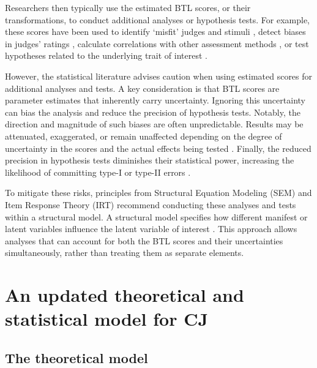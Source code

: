 \documentclass[
  authoryear,
  preprint,
  1p]{elsarticle}
\begin{document}
Researchers then typically use the estimated BTL scores, or their
transformations, to conduct additional analyses or hypothesis tests. For
example, these scores have been used to identify `misfit' judges and
stimuli \citep{Pollitt_2012b, vanDaal_et_al_2016, Goossens_et_al_2018},
detect biases in judges' ratings
\citep{Pollitt_et_al_2003, Pollitt_2012b}, calculate correlations with
other assessment methods \citep{Goossens_et_al_2018, Bouwer_et_al_2023},
or test hypotheses related to the underlying trait of interest
\citep{Bramley_et_al_2019, Boonen_et_al_2020, Bouwer_et_al_2023, vanDaal_et_al_2017, Jones_et_al_2019, Gijsen_et_al_2021}.

However, the statistical literature advises caution when using estimated
scores for additional analyses and tests. A key consideration is that
BTL scores are parameter estimates that inherently carry uncertainty.
Ignoring this uncertainty can bias the analysis and reduce the precision
of hypothesis tests. Notably, the direction and magnitude of such biases
are often unpredictable. Results may be attenuated, exaggerated, or
remain unaffected depending on the degree of uncertainty in the scores
and the actual effects being tested
\citetext{\citealp[pp.~25]{Kline_et_al_2023}; \citealp[pp.~137]{Hoyle_et_al_2023}}.
Finally, the reduced precision in hypothesis tests diminishes their
statistical power, increasing the likelihood of committing type-I or
type-II errors \citep{McElreath_2020}.

To mitigate these risks, principles from Structural Equation Modeling
(SEM) \citep[pp.~138]{Hoyle_et_al_2023} and Item Response Theory (IRT)
\citetext{\citealp[chap.~6]{Fox_2010}; \citealp[chap.~24]{vanderLinden_et_al_2017_I}}
recommend conducting these analyses and tests within a structural model.
A structural model specifies how different manifest or latent variables
influence the latent variable of interest \citep{Everitt_et_al_2010}.
This approach allows analyses that can account for both the BTL scores
and their uncertainties simultaneously, rather than treating them as
separate elements.

\section{An updated theoretical and statistical model for
CJ}\label{sec-theory}

\subsection{The theoretical model}\label{sec-theory-theoretical}
\end{document}
